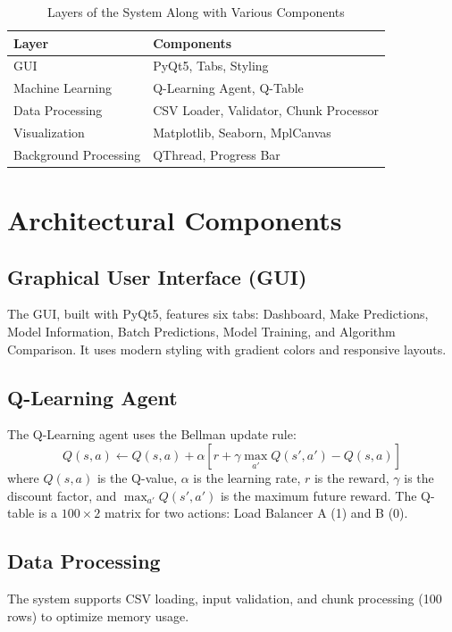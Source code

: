 \documentclass[runningheads]{llncs}
\begin{document}
\begin{table}
\caption{Layers of the System Along with Various Components}
\label{tab:layers}
\begin{tabular}{ll}
\toprule
\textbf{Layer} & \textbf{Components} \\
\midrule
GUI & PyQt5, Tabs, Styling \\
Machine Learning & Q-Learning Agent, Q-Table \\
Data Processing & CSV Loader, Validator, Chunk Processor \\
Visualization & Matplotlib, Seaborn, MplCanvas \\
Background Processing & QThread, Progress Bar \\
\bottomrule
\end{tabular}
\end{table}

\section{Architectural Components}\label{architectural-components}

\subsection{Graphical User Interface (GUI)}\label{graphical-user-interface-gui}
The GUI, built with PyQt5, features six tabs: Dashboard, Make Predictions, Model Information, Batch Predictions, Model Training, and Algorithm Comparison. It uses modern styling with gradient colors and responsive layouts.

\subsection{Q-Learning Agent}\label{q-learning-agent}
The Q-Learning agent uses the Bellman update rule:
\begin{equation}
Q(s, a) \leftarrow Q(s, a) + \alpha \left[ r + \gamma \max_{a'} Q(s', a') - Q(s, a) \right]
\end{equation}
where $Q(s, a)$ is the Q-value, $\alpha$ is the learning rate, $r$ is the reward, $\gamma$ is the discount factor, and $\max_{a'} Q(s', a')$ is the maximum future reward. The Q-table is a $100 \times 2$ matrix for two actions: Load Balancer A (1) and B (0).

\subsection{Data Processing}\label{data-processing}
The system supports CSV loading, input validation, and chunk processing (100 rows) to optimize memory usage.
\end{document}
